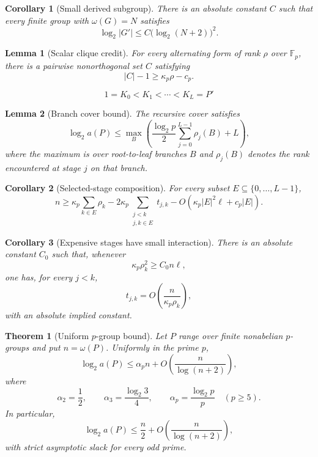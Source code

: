 \documentclass[10pt,a4paper]{amsart}
\newtheorem{lemma}{Lemma}
\newtheorem{corollary}{Corollary}
\newtheorem{theorem}{Theorem}
\newcommand{\F}{\mathbb{F}}
\begin{document}
\begin{corollary}[Small derived subgroup]\label{cor:derived}
There is an absolute constant $C$ such that every finite group with $\omega(G)=N$ satisfies
\[
\log_2|G'|\le C\bigl(\log_2(N+2)\bigr)^2.
\]
\end{corollary}

\begin{lemma}[Scalar clique credit]\label{lem:scalar-credit}
For every alternating form of rank $\rho$ over $\F_p$, there is a pairwise nonorthogonal set $C$ satisfying
\[
|C|-1\ge \kappa_p\rho-c_p.
\]
\end{lemma}

\begin{equation}\label{eq:central-series}
1=K_0<K_1<\cdots<K_L=P'
\end{equation}

\begin{lemma}[Branch cover bound]\label{lem:branch}
The recursive cover satisfies
\[
\log_2 a(P)\le \max_B\left(\frac{\log_2 p}{2}\sum_{j=0}^{L-1}\rho_j(B)+L\right),
\]
where the maximum is over root-to-leaf branches $B$ and $\rho_j(B)$ denotes the rank encountered at stage $j$ on that branch.
\end{lemma}

\begin{corollary}[Selected-stage composition]\label{cor:selected}
For every subset $E\subseteq\{0,\ldots,L-1\}$,
\[
n\ge\kappa_p\sum_{k\in E}\rho_k-2\kappa_p\!\sum_{\substack{j<k\\ j,k\in E}}t_{j,k}-O\!\left(\kappa_p|E|^2\ell+c_p|E|\right).
\]
\end{corollary}

\begin{corollary}[Expensive stages have small interaction]\label{cor:small-interaction}
There is an absolute constant $C_0$ such that, whenever
\[
\kappa_p\rho_k^2\ge C_0n\ell,
\]
one has, for every $j<k$,
\[
t_{j,k}=O\!\left(\frac{n}{\kappa_p\rho_k}\right),
\]
with an absolute implied constant.
\end{corollary}

\begin{theorem}[Uniform $p$-group bound]\label{thm:pgroup}
Let $P$ range over finite nonabelian $p$-groups and put $n=\omega(P)$. Uniformly in the prime $p$,
\[
\log_2a(P)\le\alpha_p n+O\!\left(\frac{n}{\log(n+2)}\right),
\]
where
\[
\alpha_2=\frac12,\qquad \alpha_3=\frac{\log_2 3}{4},\qquad \alpha_p=\frac{\log_2 p}{p}\quad(p\ge5).
\]
In particular,
\[
\log_2a(P)\le\frac n2+O\!\left(\frac{n}{\log(n+2)}\right),
\]
with strict asymptotic slack for every odd prime.
\end{theorem}
\end{document}
